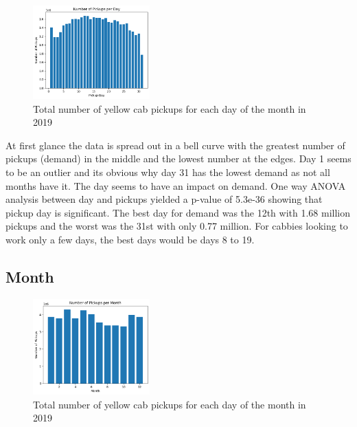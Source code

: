 \documentclass[11pt]{article}
\begin{document}
\begin{figure}[h]
    \includegraphics[width=0.4\textwidth]{plots/day.png}
    \centering
    \caption{Total number of yellow cab pickups for each day of the month in 2019} %
\end{figure}

At first glance the data is spread out in a bell curve with the greatest number of pickups (demand) in the middle and the lowest number at the edges. Day 1 seems to be an outlier and its obvious why day 31 has the lowest demand as not all months have it. The day seems to have an impact on demand. One way ANOVA analysis between day and pickups yielded a p-value of 5.3e-36 showing that pickup day is significant. The best day for demand was the 12th with 1.68 million pickups and the worst was the 31st with only 0.77 million. For cabbies looking to work only a few days, the best days would be days 8 to 19.

\subsection{Month}

\begin{figure}[h]
    \includegraphics[width=0.4\textwidth]{plots/month.png}
    \centering
    \caption{Total number of yellow cab pickups for each day of the month in 2019} %
\end{figure}
\end{document}
